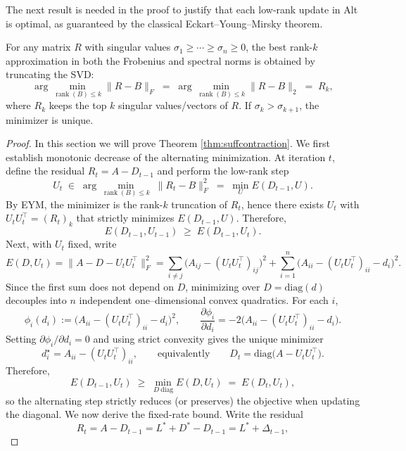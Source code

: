 \documentclass[final,hidelinks,onefignum,onetabnum]{siamart250211}
\providecommand{\diag}{\mathrm{diag}}
\providecommand{\1}{\mathbf{1}}
\theoremstyle{plain}
\begin{document}
\noindent
The next result is needed in the proof to justify that each low‐rank update in Alt is optimal,
as guaranteed by the classical Eckart–Young–Mirsky theorem.


\begin{theorem}
\label{thm:eym}
    For any matrix \(R\) with singular values \(\sigma_1 \ge \cdots \ge \sigma_n \ge 0\), the best rank-\(k\) approximation
in both the Frobenius and spectral norms is obtained by truncating the SVD:
\[
\arg\min_{\operatorname{rank}(B)\le k}\|R-B\|_F
\;=\;
\arg\min_{\operatorname{rank}(B)\le k}\|R-B\|_2
\;=\; R_k,
\]
where \(R_k\) keeps the top \(k\) singular values/vectors of \(R\). If \(\sigma_k>\sigma_{k+1}\), the minimizer is unique.
\end{theorem}


\begin{proof}
In this section we will prove Theorem \ref{thm:suffcontraction}.
We first establish monotonic decrease of the alternating minimization. 
At iteration \(t\), define the residual \(R_t = A - D_{t-1}\) and perform the low-rank step
\[
U_t \;\in\; 
\arg\min_{\operatorname{rank}(B)\le k}\;\|R_t - B\|_F^2
\;=\;
\min_U E(D_{t-1},U).
\]
By EYM, the minimizer is the rank-\(k\) truncation of \(R_t\), hence there exists \(U_t\) with
\(U_tU_t^\top = (R_t)_k\) that strictly minimizes \(E(D_{t-1},U)\). Therefore,
\[
E(D_{t-1},U_{t-1})
\;\ge\;
E(D_{t-1},U_t).
\]
Next, with \(U_t\) fixed, write
\[
E(D,U_t)=\|A-D-U_tU_t^\top\|_F^2
=\sum_{i\neq j}\!\bigl(A_{ij}-(U_tU_t^\top)_{ij}\bigr)^2
+\sum_{i=1}^n\bigl(A_{ii}-(U_tU_t^\top)_{ii}-d_i\bigr)^2.
\]
Since the first sum does not depend on \(D\), minimizing over \(D=\diag(d)\) decouples into \(n\) independent
one–dimensional convex quadratics. For each \(i\),
\[
\phi_i(d_i):=\bigl(A_{ii}-(U_tU_t^\top)_{ii}-d_i\bigr)^2,\qquad
\frac{\partial \phi_i}{\partial d_i}=-2\bigl(A_{ii}-(U_tU_t^\top)_{ii}-d_i\bigr).
\]
Setting \(\partial \phi_i/\partial d_i=0\) and using strict convexity gives the unique minimizer
\begin{equation}
\label{eq:diag_update}
d_i^\star
= A_{ii} - (U_tU_t^\top)_{ii},
\qquad\text{equivalently}\qquad
D_t = \diag\!\bigl(A - U_tU_t^\top\bigr).
\end{equation}
Therefore,
\[
E(D_{t-1},U_t)\;\ge\;\min_{D\ \text{diag}}E(D,U_t)\;=\;E(D_t,U_t),
\]
so the alternating step strictly reduces (or preserves) the objective when updating the diagonal.
We now derive the fixed‐rate bound.  Write the residual
\[
R_t = A - D_{t-1}
    = L^* + D^* - D_{t-1}
    = L^* + \Delta_{t-1},
\]
\end{proof}
\end{document}
